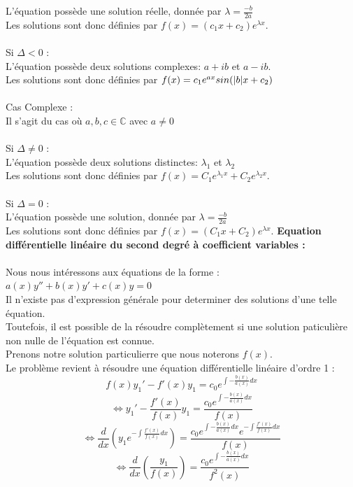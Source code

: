 \documentclass[12pt, letterpaper]{article}
\begin{document}
L'équation possède une solution réelle, donnée par $\lambda = \frac{-b}{2a}$
\\
Les solutions sont donc définies par $f(x) = (c_1x + c_2)e^{\lambda x}$.
\\
\\
Si $\Delta < 0$ : \\
L'équation possède deux solutions complexes: $a + ib$ et $a-ib$.
\\
Les solutions sont donc définies par $f(x) = c_1e^{ax}sin(\abs{b}x + c_2)$
\\
\\
Cas Complexe :
\\
Il s'agit du cas où $a,b,c \in \mathbb{C}$ avec $a \neq 0$
\\
\\
Si $\Delta \neq 0$ :
\\
L'équation possède deux solutions distinctes: $\lambda_1$ et $\lambda_2$
\\
Les solutions sont donc définies par $f(x) = C_1e^{\lambda_1 x} + C_2e^{\lambda_2 x}$.
\\
\\
Si $\Delta = 0$ : \\
L'équation possède une solution, donnée par $\lambda = \frac{-b}{2a}$
\\
Les solutions sont donc définies par $f(x) = (C_1x + C_2)e^{\lambda x}$.
\newpage
\noindent \textbf{Equation différentielle linéaire du second degré à coefficient variables :}
\\
\\
Nous nous intéressons aux équations de la forme : $a(x)y'' + b(x)y' + c(x)y = 0$ 
\\
Il n'existe pas d'expression générale pour determiner des solutions d'une telle équation. \\
Toutefois, il est possible de la résoudre complètement si une solution paticulière non nulle de l'équation est connue.
\\
Prenons notre solution particulierre que nous noterons $f(x)$.
\\
Le problème revient à résoudre une équation différentielle linéaire d'ordre 1 :
\\
\[
f(x)y_1' - f'(x)y_1 = c_0 e^{\int -\frac{b(x)}{a(x)} dx} 
\]
\[
\Leftrightarrow y_1' - \frac{f'(x)}{f(x)}y_1 = \frac{c_0 e^{\int -\frac{b(x)}{a(x)} dx} }{f(x)}
\]
\[
\Leftrightarrow \frac{d}{dx} \left( y_1e^{-\int \frac{f'(x)}{f(x)} dx} \right) = \frac{c_0 e^{\int -\frac{b(x)}{a(x)} dx} e^{-\int \frac{f'(x)}{f(x)} dx}}{f(x)}
\]
\[
\Leftrightarrow \frac{d}{dx} \left( \frac{y_1}{f(x)} \right) = \frac{c_0 e^{\int -\frac{b(x)}{a(x)} dx}}{f^2(x)}
\]
\end{document}
